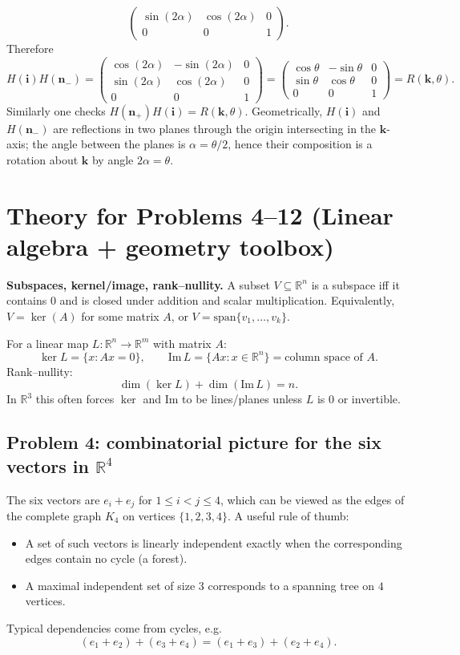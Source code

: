 \documentclass[12pt,a4paper]{article}
\theoremstyle{plain}
\theoremstyle{definition}      %
\begin{document}
\begin{enumerate}[label=(\alph*)]
\[\begin{pmatrix}
		\sin(2\alpha) & \cos(2\alpha) & 0\\
		0&0&1
	\end{pmatrix}.
	\]
	Therefore
	\[
	H(\mathbf i)H(\mathbf n_-)=
	\begin{pmatrix}
		\cos(2\alpha) & -\sin(2\alpha) & 0\\
		\sin(2\alpha) & \cos(2\alpha) & 0\\
		0&0&1
	\end{pmatrix}
	=
	\begin{pmatrix}
		\cos\theta & -\sin\theta & 0\\
		\sin\theta & \cos\theta & 0\\
		0&0&1
	\end{pmatrix}
	=R(\mathbf k,\theta).
	\]
	Similarly one checks $H(\mathbf n_+)H(\mathbf i)=R(\mathbf k,\theta)$.
	Geometrically, $H(\mathbf i)$ and $H(\mathbf n_-)$ are reflections in two planes through the origin intersecting in the $\mathbf k$-axis; the angle between the planes is $\alpha=\theta/2$, hence their composition is a rotation about $\mathbf k$ by angle $2\alpha=\theta$.
\end{enumerate}

\section*{Theory for Problems 4--12 (Linear algebra + geometry toolbox)}

\textbf{Subspaces, kernel/image, rank--nullity.}
A subset $V\subseteq\mathbb R^n$ is a subspace iff it contains $0$ and is closed under addition and scalar multiplication.
Equivalently, $V=\ker(A)$ for some matrix $A$, or $V=\mathrm{span}\{v_1,\dots,v_k\}$.

For a linear map $L:\mathbb R^n\to\mathbb R^m$ with matrix $A$:
\[
\ker L=\{x:Ax=0\},\qquad \mathrm{Im}\,L=\{Ax:x\in\mathbb R^n\}=\text{column space of }A.
\]
Rank--nullity:
\[
\dim(\ker L)+\dim(\mathrm{Im}\,L)=n.
\]
In $\mathbb R^3$ this often forces $\ker$ and $\mathrm{Im}$ to be lines/planes unless $L$ is $0$ or invertible.

\subsection*{Problem 4: combinatorial picture for the six vectors in $\mathbb R^4$}
The six vectors are $e_i+e_j$ for $1\le i<j\le 4$, which can be viewed as the edges of the complete graph $K_4$ on vertices $\{1,2,3,4\}$.
A useful rule of thumb:
\begin{itemize}
	\item A set of such vectors is linearly independent exactly when the corresponding edges contain no cycle (a forest).
	\item A maximal independent set of size $3$ corresponds to a spanning tree on $4$ vertices.
\end{itemize}
Typical dependencies come from cycles, e.g.
\[
(e_1+e_2)+(e_3+e_4)=(e_1+e_3)+(e_2+e_4).
\]
\end{document}
